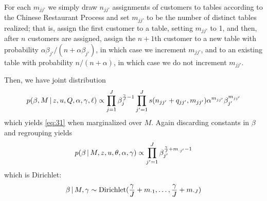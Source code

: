 For each $m_{jj'}$ we simply draw $n_{jj'}$ assignments of customers
to tables according to the Chinese Restaurant Process and set
$m_{jj'}$ to be the number of distinct tables realized; that is,
assign the first customer to a table, setting $m_{jj'}$ to 1, and
then, after $n$ customers are assigned, assign the $n+1$th customer to
a new table with probability $\alpha\beta_{j'} / (n +
\alpha\beta_{j'})$, in which case we increment $m_{jj'}$, and to an
existing table with probability $n / (n + \alpha)$, in which case we
do not increment $m_{jj'}$.



Then, we have joint distribution
\begin{equation}
  \label{eq:33} p(\beta, M \, \vert \, z, u, Q, \alpha, \gamma, \ell)
\propto \prod_{j=1}^J \beta_j^{\frac{\gamma}{J} - 1} \prod_{j'=1}^{J}
s(n_{jj'} + q_{jj'}, m_{jj'}) \alpha^{m_{jj'}} \beta_{j'}^{m_{jj'}}
\end{equation} which yields \eqref{eq:31} when marginalized over $M$.
Again discarding constants in $\beta$ and regrouping yields
\begin{equation}
  \label{eq:34} p(\beta \, \vert \, M, z, u, \theta, \alpha, \gamma)
\propto \prod_{{j'}=1}^J \beta_{j'}^{\frac{\gamma}{J} + m_{\cdot
{j'}}- 1}
\end{equation} which is Dirichlet:
\begin{equation}
  \label{eq:38} \beta \, \vert \, M, \gamma \sim
\mathrm{Dirichlet}(\frac{\gamma}{J} + m_{\cdot 1}, \dots,
\frac{\gamma}{J} + m_{\cdot J})
\end{equation}

